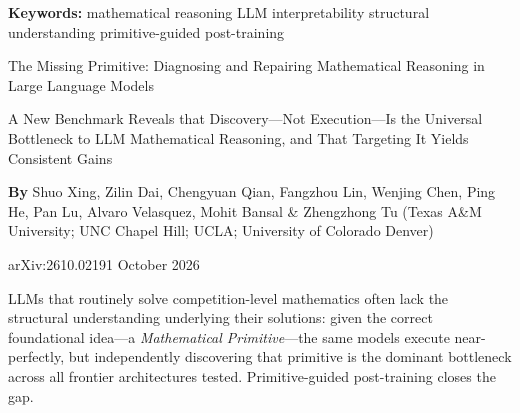 \documentclass[10pt,twocolumn]{article}
\begin{document}
\setlength{\parindent}{0pt}
\setlength{\parskip}{4pt}

{\small\color{keywordgray}\textbf{Keywords:}
  mathematical reasoning \textbullet{}
  LLM interpretability \textbullet{}
  structural understanding \textbullet{}
  primitive-guided post-training}\par\vspace{4pt}

{\LARGE\bfseries\raggedright
  The Missing Primitive: Diagnosing and Repairing Mathematical Reasoning in Large Language Models}\par\vspace{4pt}

{\large\itshape\raggedright
  A New Benchmark Reveals that Discovery---Not Execution---Is the Universal Bottleneck
  to LLM Mathematical Reasoning, and That Targeting It Yields Consistent Gains}\par\vspace{6pt}

{\small\textbf{By} Shuo Xing, Zilin Dai, Chengyuan Qian, Fangzhou Lin, Wenjing Chen,
  Ping He, Pan Lu, Alvaro Velasquez, Mohit Bansal \& Zhengzhong Tu
  (Texas A\&M University; UNC Chapel Hill; UCLA; University of Colorado Denver)}\par\vspace{2pt}

{\small\color{keywordgray}arXiv:2610.02191 \textbullet{} October 2026}
\par\vspace{2pt}\noindent{\color{rulered}\rule{\columnwidth}{0.6pt}}\vspace{6pt}

LLMs that routinely solve competition-level mathematics often lack the structural understanding
underlying their solutions: given the correct foundational idea---a \emph{Mathematical Primitive}---the
same models execute near-perfectly, but independently discovering that primitive is the dominant
bottleneck across all frontier architectures tested. Primitive-guided post-training closes the gap.
\end{document}
